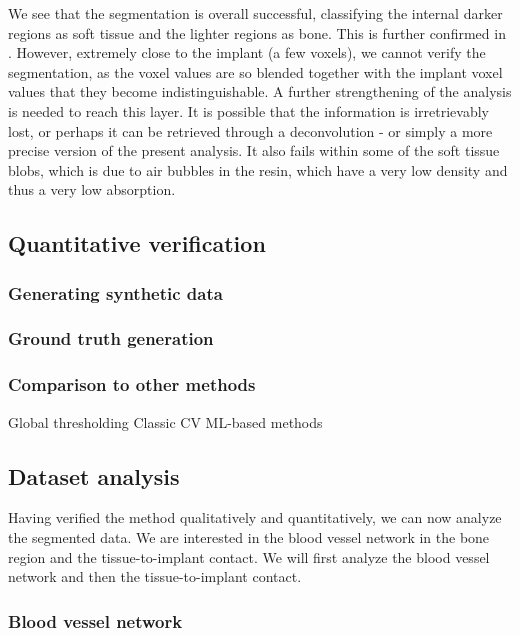 We see that the segmentation is overall successful, classifying the internal
darker regions as soft tissue and the lighter regions as bone. This is further
confirmed in . However, extremely close to the implant
(a few voxels), we cannot verify the segmentation, as the voxel values are so
blended together with the implant voxel values that they become
indistinguishable. A further strengthening of the analysis is needed to reach
this layer. It is possible that the information is irretrievably lost, or
perhaps it can be retrieved through a deconvolution - or simply a more precise
version of the present analysis. It also fails within some of the soft tissue
blobs, which is due to air bubbles in the resin, which have a very low density
and thus a very low absorption.



\subsection{Quantitative verification}
\subsubsection{Generating synthetic data}
\subsubsection{Ground truth generation}
\subsubsection{Comparison to other methods}
Global thresholding
Classic CV
ML-based methods

\subsection{Dataset analysis}

Having verified the method qualitatively and quantitatively, we can now analyze
the segmented data. We are interested in the blood vessel network in the bone
region and the tissue-to-implant contact. We will first analyze the blood
vessel network and then the tissue-to-implant contact.

\subsubsection{Blood vessel network}
\label{sec:blood-network}

